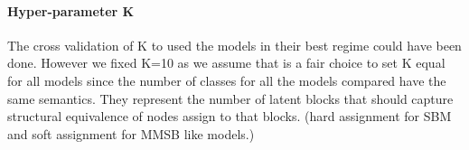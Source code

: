 \documentclass{article}
\begin{document}
\paragraph{Hyper-parameter K} The cross validation of K to used the models in their best regime could have been done. However we fixed K=10  as we assume that is a fair choice to set K equal for all models since the number of classes for all the models compared have the same semantics. They represent the number of latent blocks that should capture structural equivalence of nodes assign to that blocks. (hard assignment for SBM and soft assignment for MMSB like models.)
\end{document}
